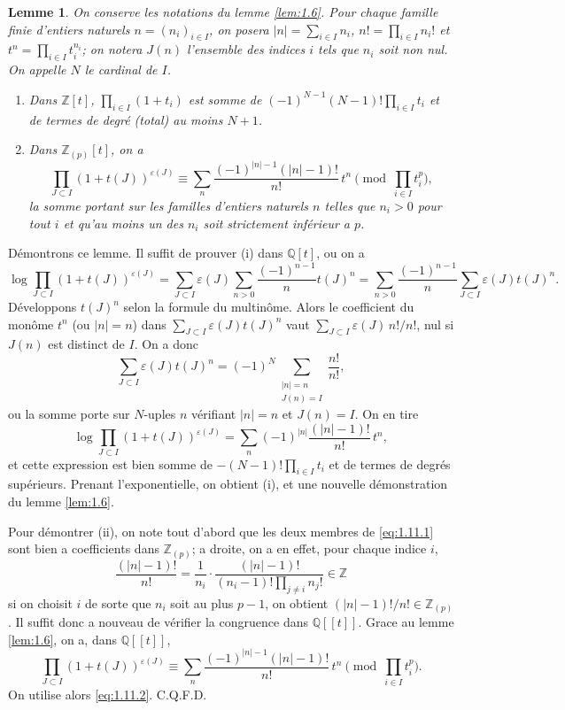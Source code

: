 \documentclass[12pt,a4paper]{article}
\theoremstyle{plain}
\newtheorem{lemma}[theorem]{Lemme}
\theoremstyle{definition}
\theoremstyle{remark}
\newcommand{\bQ}{\mathbb{Q}}
\newcommand{\bZ}{\mathbb{Z}}
\begin{document}
\begin{lemma}\label{lem:1.11}
On conserve les notations du lemme \ref{lem:1.6}. Pour chaque famille finie d'entiers naturels $n = (n_i)_{i \in I}$, on posera $|n| = \sum_{i \in I} n_i$, $n! = \prod_{i \in I} n_i!$ et $t^n = \prod_{i \in I} t_i^{n_i}$; on notera $J(n)$ l'ensemble des indices $i$ tels que $n_i$ soit non nul. On appelle $N$ le cardinal de $I$.
\begin{enumerate}[label=(\roman*)]
\item Dans $\bZ[t]$, $\prod_{i \in I}(1+t_i)$ est somme de $(-1)^{N-1}(N-1)! \prod_{i \in I} t_i$ et de termes de degr\'e (total) au moins $N+1$.
\item Dans $\bZ_{(p)}[t]$, on a
\begin{equation}\label{eq:1.11.1}
\prod_{J \subset I}(1+t(J))^{\varepsilon(J)} \equiv \sum_n \frac{(-1)^{|n|-1}(|n|-1)!}{n!} \, t^n \pmod{\prod_{i \in I} t_i^p},
\end{equation}
la somme portant sur les familles d'entiers naturels $n$ telles que $n_i > 0$ pour tout $i$ et qu'au moins un des $n_i$ soit strictement inf\'erieur a $p$.
\end{enumerate}
\end{lemma}

D\'emontrons ce lemme. Il suffit de prouver (i) dans $\bQ[t]$, ou on a
\[
\log \prod_{J \subset I}(1+t(J))^{\varepsilon(J)} = \sum_{J \subset I} \varepsilon(J) \sum_{n>0} \frac{(-1)^{n-1}}{n} t(J)^n = \sum_{n>0} \frac{(-1)^{n-1}}{n} \sum_{J \subset I} \varepsilon(J) t(J)^n.
\]
D\'eveloppons $t(J)^n$ selon la formule du multin\^ome. Alors le coefficient du mon\^ome $t^n$ (ou $|n| = n$) dans $\sum_{J \subset I} \varepsilon(J) t(J)^n$ vaut $\sum_{J \subset I} \varepsilon(J) \, n!/n!$, nul si $J(n)$ est distinct de $I$.
On a donc
\[
\sum_{J \subset I} \varepsilon(J) t(J)^n = (-1)^N \sum_{\substack{|n|=n \\ J(n)=I}} \frac{n!}{n!},
\]
ou la somme porte sur $N$-uples $n$ v\'erifiant $|n| = n$ et $J(n) = I$. On en tire
\begin{equation}\label{eq:1.11.2}
\log \prod_{J \subset I}(1+t(J))^{\varepsilon(J)} = \sum_n (-1)^{|n|} \frac{(|n|-1)!}{n!} \, t^n,
\end{equation}
et cette expression est bien somme de $-(N-1)! \prod_{i \in I} t_i$ et de termes de degr\'es sup\'erieurs. Prenant l'exponentielle, on obtient (i), et une nouvelle d\'emonstration du lemme \ref{lem:1.6}.

Pour d\'emontrer (ii), on note tout d'abord que les deux membres de \eqref{eq:1.11.1} sont bien a coefficients dans $\bZ_{(p)}$; a droite, on a en effet, pour chaque indice $i$,
\[
\frac{(|n|-1)!}{n!} = \frac{1}{n_i} \cdot \frac{(|n|-1)!}{(n_i-1)! \prod_{j \neq i} n_j!} \in \bZ
\]
si on choisit $i$ de sorte que $n_i$ soit au plus $p-1$, on obtient $(|n|-1)!/n! \in \bZ_{(p)}$. Il suffit donc a nouveau de v\'erifier la congruence dans $\bQ[[t]]$. Grace au lemme \ref{lem:1.6}, on a, dans $\bQ[[t]]$,
\[
\prod_{J \subset I}(1+t(J))^{\varepsilon(J)} \equiv \sum_n \frac{(-1)^{|n|-1}(|n|-1)!}{n!} \, t^n \pmod{\prod_{i \in I} t_i^p}.
\]
On utilise alors \eqref{eq:1.11.2}. C.Q.F.D.
\end{document}
